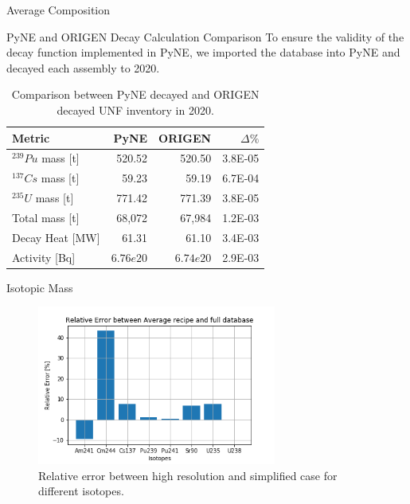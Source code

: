 \documentclass[final]{beamer}
\newlength{\onecolwid}
\newlength{\threecolwid}
\begin{document}
\begin{frame}[t]
\begin{columns}[t,totalwidth=\threecolwid]
\begin{column}{\onecolwid}
\begin{block}{Average Composition}
\end{block}

\begin{block}{PyNE and ORIGEN Decay Calculation Comparison}
To ensure the validity of the decay function implemented in \gls{PyNE}, 
we imported the database into \gls{PyNE} and decayed each assembly
to 2020.

\begin{table}[h]
    \centering
    \begin{tabular}{l|rr|r}
        \hline
        Metric & PyNE & ORIGEN & $\Delta \%$ \\
        \hline
        $^{239}Pu$ mass [t] & 520.52 & 520.50 & 3.8E-05\\
        $^{137}Cs$ mass [t] & 59.23 & 59.19 & 6.7E-04\\
        $^{235}U$ mass [t] & 771.42 & 771.39 & 3.8E-05\\
        Total mass [t] & 68,072 & 67,984 & 1.2E-03\\
        Decay Heat [MW] & 61.31 & 61.10 & 3.4E-03 \\
        Activity [Bq] & $6.76e20$ & $6.74e20$ & 2.9E-03 \\
        \hline
    \end{tabular}
    \caption{Comparison between \gls{PyNE} decayed and ORIGEN decayed \gls{UNF} inventory in 2020.}
\end{table}
\end{block}


\begin{block}{Isotopic Mass}

\begin{figure}
    \centering
    \includegraphics[width=0.7\textwidth]{../images/iso_rel.png}
    \caption{Relative error between high resolution and simplified case for different isotopes.}
    \label{fig:iso_rel}
\end{figure}



\end{block}
\end{column}
\end{columns}
\end{frame}
\end{document}

